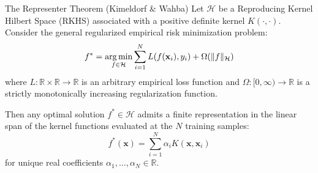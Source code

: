 \begin{theorembox}{The Representer Theorem (Kimeldorf \& Wahba)}
Let $\mathcal{H}$ be a Reproducing Kernel Hilbert Space (RKHS) associated with a positive definite kernel $K(\cdot, \cdot)$. Consider the general regularized empirical risk minimization problem:
\begin{equation}
f^* = \operatorname*{arg\,min}_{f \in \mathcal{H}} \sum_{i=1}^N L(f(\mathbf{x}_i), y_i) + \Omega(\|f\|_{\mathcal{H}})
\label{eq:representer_prob}
\end{equation}
where $L: \mathbb{R} \times \mathbb{R} \to \mathbb{R}$ is an arbitrary empirical loss function and $\Omega: [0, \infty) \to \mathbb{R}$ is a strictly monotonically increasing regularization function.

Then any optimal solution $f^* \in \mathcal{H}$ admits a finite representation in the linear span of the kernel functions evaluated at the $N$ training samples:
\begin{equation}
f^*(\mathbf{x}) = \sum_{i=1}^N \alpha_i K(\mathbf{x}, \mathbf{x}_i)
\label{eq:representer_expansion}
\end{equation}
for unique real coefficients $\alpha_1, \dots, \alpha_N \in \mathbb{R}$.
\end{theorembox}

